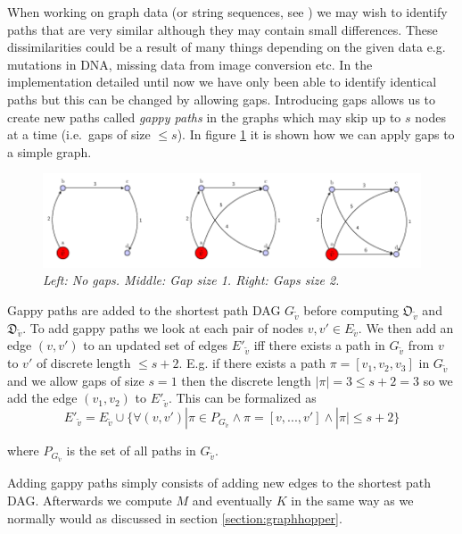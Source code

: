 \documentclass{article}
\begin{document}
When working on graph data (or string sequences, see \cite{string-kernels}) we may wish to identify paths that are very similar although they may contain small differences. These dissimilarities could be a result of many things depending on the given data e.g. mutations in DNA, missing data from image conversion etc. In the implementation detailed until now we have only been able to identify identical paths but this can be changed by allowing gaps. Introducing gaps allows us to create new paths called \textit{gappy paths} in the graphs which may skip up to $s$ nodes at a time (i.e.\ gaps of size $\leq s$). In figure \ref{fig:simple_gaps} it is shown how we can apply gaps to a simple graph.
\begin{figure}[H]
	\centering
	\includegraphics[width=12cm]{gaps}
	\caption{\textit{Left: No gaps. Middle: Gap size 1. Right: Gaps size 2.}}
	\label{fig:simple_gaps}
\end{figure}

Gappy paths are added to the shortest path DAG $G_{\tilde{v}}$ before computing $\mathfrak{O}_{\tilde{v}}$ and $\mathfrak{D}_{\tilde{v}}$. To add gappy paths we look at each pair of nodes $v,v'\in E_{\tilde{v}}$. We then add an edge $(v,v')$ to an updated set of edges $E'_{\tilde{v}}$ iff there exists a path in $G_{\tilde{v}}$ from $v$ to $v'$ of discrete length $\leq s + 2$. E.g. if there exists a path $\pi=[v_1,v_2,v_3]$ in $G_{\tilde{v}}$ and we allow gaps of size $s=1$ then the discrete length $|\pi| = 3 \leq s + 2 = 3$ so we add the edge $(v_1,v_2)$ to $E'_{\tilde{v}}$. This can be formalized as
\begin{equation}
\label{eq:gaps}
E'_{\tilde{v}} = E_{\tilde{v}} \cup \{ \forall(v, v')|\pi \in P_{G_{\tilde{v}}} \land \pi = [v,...,v'] \land |\pi| \leq s + 2 \}
\end{equation}

where $P_{G_{\tilde{v}}}$ is the set of all paths in $G_{\tilde{v}}$.

Adding gappy paths simply consists of adding new edges to the shortest path DAG. Afterwards we compute $M$ and eventually $K$ in the same way as we normally would as discussed in section \ref{section:graphhopper}.
\end{document}
